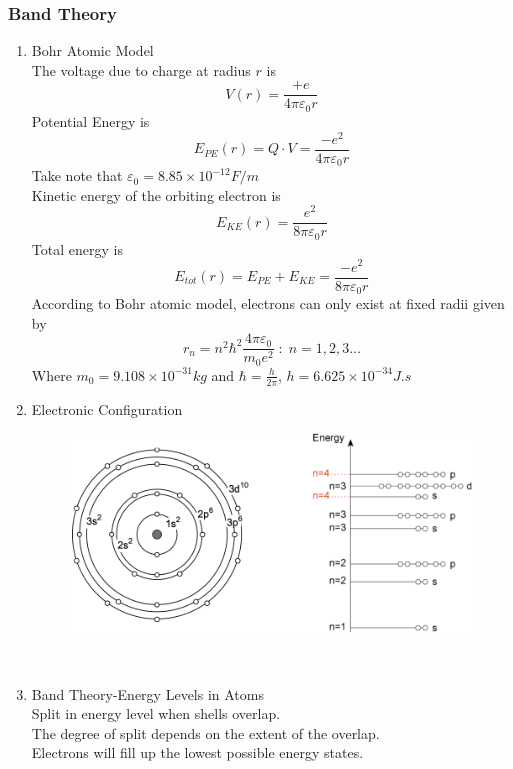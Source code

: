 \subsubsection{Band Theory}
\begin{enumerate}
    \item Bohr Atomic Model \\
    The voltage due to charge at radius $r$ is 
    \[V(r) = \frac{+e}{4\pi \varepsilon_0 r}\]
    Potential Energy is
    \[E_{PE}(r) = Q\cdot V = \frac{-e^2}{4\pi \varepsilon_0 r}\]
    Take note that $\varepsilon_0 = 8.85\times 10^{-12} F/m$ \\
    Kinetic energy of the orbiting electron is 
    \[E_{KE}(r) = \frac{e^2}{8\pi \varepsilon_0 r}\]
    Total energy is 
    \[E_{tot}(r) = E_{PE}+E_{KE} = \frac{-e^2}{8\pi \varepsilon_0 r}\]
    According to Bohr atomic model, electrons can only exist at fixed radii given by 
    \begin{equation}
        r_n = n^2 \hbar^2 \frac{4\pi \varepsilon_0}{m_0 e^2}\; :\; n = 1,2,3\ldots 
    \end{equation}
    Where $m_0 = 9.108\times 10^{-31} kg$ and $\hbar = \frac{h}{2\pi}$, $h = 6.625\times 10^{-34} J.s$
    \item Electronic Configuration \\
    \begin{figure}[h]
        \centering
        \includegraphics[width=0.75\linewidth]{image/eleconifg.png}
    \end{figure}
     \\
    \item Band Theory-Energy Levels in Atoms \\
    Split in energy level when shells overlap. \\
    The degree of split depends on the extent of the overlap. \\
    Electrons will fill up the lowest possible energy states. \\
      \\
    \begin{minipage}{0.5\textwidth}

\end{minipage}
\end{enumerate}

